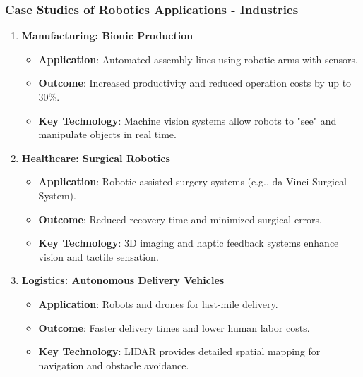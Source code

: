 \documentclass{beamer}
\begin{document}
\begin{frame}[fragile]
    \frametitle{Case Studies of Robotics Applications - Industries}
    \begin{enumerate}
        \item \textbf{Manufacturing: Bionic Production}
            \begin{itemize}
                \item \textbf{Application}: Automated assembly lines using robotic arms with sensors.
                \item \textbf{Outcome}: Increased productivity and reduced operation costs by up to 30\%.
                \item \textbf{Key Technology}: Machine vision systems allow robots to "see" and manipulate objects in real time.
            \end{itemize}
        
        \item \textbf{Healthcare: Surgical Robotics}
            \begin{itemize}
                \item \textbf{Application}: Robotic-assisted surgery systems (e.g., da Vinci Surgical System).
                \item \textbf{Outcome}: Reduced recovery time and minimized surgical errors.
                \item \textbf{Key Technology}: 3D imaging and haptic feedback systems enhance vision and tactile sensation.
            \end{itemize}
        
        \item \textbf{Logistics: Autonomous Delivery Vehicles}
            \begin{itemize}
                \item \textbf{Application}: Robots and drones for last-mile delivery.
                \item \textbf{Outcome}: Faster delivery times and lower human labor costs.
                \item \textbf{Key Technology}: LIDAR provides detailed spatial mapping for navigation and obstacle avoidance.
            \end{itemize}
    \end{enumerate}
\end{frame}
\end{document}
